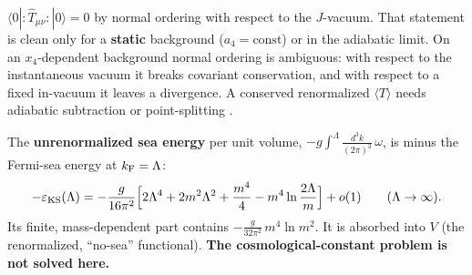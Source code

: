 $\langle0|{:}\hat T_{\mu\nu}{:}|0\rangle=0$ by normal ordering with respect to the $J$-vacuum. That
statement is clean only for a \textbf{static} background ($a_4=\text{const}$) or in the adiabatic
limit. On an $x_4$-dependent background normal ordering is ambiguous: with respect to the
instantaneous vacuum it breaks covariant conservation, and with respect to a fixed in-vacuum it leaves
a divergence. A conserved renormalized $\langle T\rangle$ needs adiabatic subtraction or
point-splitting .

The \textbf{unrenormalized sea energy} per unit volume, $-g\int^{\Lambda}\frac{d^3k}{(2\pi)^3}\,\omega$,
is minus the Fermi-sea energy at $k_{\mathrm{F}}=\Lambda$:
\[
  -\varepsilon_{\mathrm{KS}}(\Lambda)=-\frac{g}{16\pi^2}\Bigl[2\Lambda^4+2m^2\Lambda^2+\frac{m^4}{4}-m^4\ln\frac{2\Lambda}{m}\Bigr]+o(1)
  \qquad(\Lambda\to\infty).
\]
Its finite, mass-dependent part contains $-\frac{g}{32\pi^2}\,m^4\ln m^2$. It is absorbed into $V$
(the renormalized, ``no-sea'' functional). \textbf{The cosmological-constant problem is not solved
here.}  

